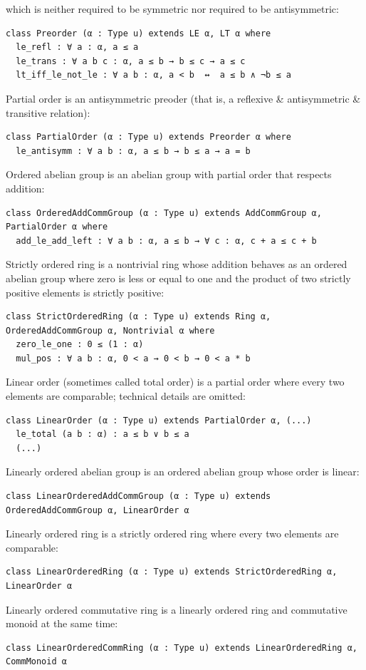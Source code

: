 \documentclass[]{article}
\renewcommand{\.}{\hskip .75pt}
\begin{document}
which is neither required to be symmetric nor required to be antisymmetric:
\begin{lstlisting}
class Preorder (α : Type u) extends LE α, LT α where
  le_refl : ∀ a : α, a ≤ a
  le_trans : ∀ a b c : α, a ≤ b → b ≤ c → a ≤ c
  lt_iff_le_not_le : ∀ a b : α, a < b  ↔  a ≤ b ∧ ¬b ≤ a 
\end{lstlisting}
Partial order is an antisymmetric preoder (that is, a reflexive \& antisymmetric \& transitive relation):
\begin{lstlisting}
class PartialOrder (α : Type u) extends Preorder α where
  le_antisymm : ∀ a b : α, a ≤ b → b ≤ a → a = b
\end{lstlisting}
Ordered abelian group is an abelian group with partial order that respects addition:
\begin{lstlisting}
class OrderedAddCommGroup (α : Type u) extends AddCommGroup α, PartialOrder α where
  add_le_add_left : ∀ a b : α, a ≤ b → ∀ c : α, c + a ≤ c + b
\end{lstlisting}
Strictly ordered ring is a nontrivial ring whose addition behaves as an ordered abelian group
where zero is less or equal to one and the product of two strictly positive elements is strictly positive:
\begin{lstlisting}
class StrictOrderedRing (α : Type u) extends Ring α, OrderedAddCommGroup α, Nontrivial α where
  zero_le_one : 0 ≤ (1 : α)
  mul_pos : ∀ a b : α, 0 < a → 0 < b → 0 < a * b
\end{lstlisting}
Linear order (sometimes called total order) is a partial order where every two elements are comparable;
technical details are omitted:
\begin{lstlisting}
class LinearOrder (α : Type u) extends PartialOrder α, (...)
  le_total (a b : α) : a ≤ b ∨ b ≤ a
  (...)
\end{lstlisting}
Linearly ordered abelian group is an ordered abelian group whose order is linear:
\begin{lstlisting}
class LinearOrderedAddCommGroup (α : Type u) extends OrderedAddCommGroup α, LinearOrder α
\end{lstlisting}
Linearly ordered ring is a strictly ordered ring where every two elements are comparable:
\begin{lstlisting}
class LinearOrderedRing (α : Type u) extends StrictOrderedRing α, LinearOrder α
\end{lstlisting}
Linearly ordered commutative ring is a linearly ordered ring and commutative monoid at the same time:
\begin{lstlisting}
class LinearOrderedCommRing (α : Type u) extends LinearOrderedRing α, CommMonoid α
\end{lstlisting}
\end{document}
